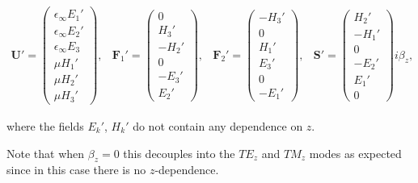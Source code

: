 \begin{equation*}
\begin{array}{ccccc}
\mathbf{U}' = \begin{pmatrix} \epsilon_{\infty} E_1' \\ \epsilon_{\infty} E_2' \\ \epsilon_{\infty} E_3 \\ \mu H_1' \\ \mu H_2' \\  \mu H_3'  \end{pmatrix} ,
&
\mathbf{F}_1' = \begin{pmatrix} 0 \\ H_3' \\ -H_2' \\ 0 \\ -E_3' \\ E_2'  \end{pmatrix} ,
&
\mathbf{F}_2' = \begin{pmatrix} - H_3' \\ 0 \\ H_1' \\ E_3' \\ 0 \\ -E_1' \end{pmatrix} ,
&
\mathbf{S}' = \begin{pmatrix} H_2' \\ -H_1' \\ 0 \\ -E_2' \\ E_1' \\ 0 \end{pmatrix} i \beta_z ,
\end{array}
\:
\end{equation*}

where the fields $E_k'$, $H_k'$ do not contain any dependence on $z$.

Note that when $\beta_z = 0$ this decouples into the $TE_z$ and $TM_z$ modes as expected since in this case there is no $z$-dependence.


